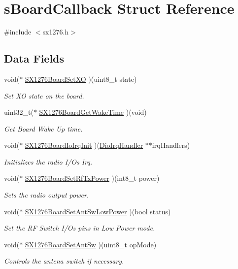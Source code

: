 \hypertarget{structsBoardCallback}{}\section{s\+Board\+Callback Struct Reference}
\label{structsBoardCallback}


{\ttfamily \#include $<$sx1276.\+h$>$}

\subsection*{Data Fields}
\begin{DoxyCompactItemize}
\item 
void($\ast$ \hyperlink{structsBoardCallback_ae6be070dbcbbcdb0f30d087e6152dd55}{S\+X1276\+Board\+Set\+XO} )(uint8\+\_\+t state)
\begin{DoxyCompactList}\small\item\em Set XO state on the board. \end{DoxyCompactList}\item 
uint32\+\_\+t($\ast$ \hyperlink{structsBoardCallback_a91e24be9e9f398614e25b89d05ee0aa3}{S\+X1276\+Board\+Get\+Wake\+Time} )(void)
\begin{DoxyCompactList}\small\item\em Get Board Wake Up time. \end{DoxyCompactList}\item 
void($\ast$ \hyperlink{structsBoardCallback_ac8a78c18252b452f5f4305be2abd1f2c}{S\+X1276\+Board\+Io\+Irq\+Init} )(\hyperlink{sx1276_8h_af462584f307238535daaea42f6ce791c}{Dio\+Irq\+Handler} $\ast$$\ast$irq\+Handlers)
\begin{DoxyCompactList}\small\item\em Initializes the radio I/\+Os Irq. \end{DoxyCompactList}\item 
void($\ast$ \hyperlink{structsBoardCallback_aec7b6d1c4de061f3d2f1bebe75c64c13}{S\+X1276\+Board\+Set\+Rf\+Tx\+Power} )(int8\+\_\+t power)
\begin{DoxyCompactList}\small\item\em Sets the radio output power. \end{DoxyCompactList}\item 
void($\ast$ \hyperlink{structsBoardCallback_a91d44db14871cfcf950cce928922ba17}{S\+X1276\+Board\+Set\+Ant\+Sw\+Low\+Power} )(bool status)
\begin{DoxyCompactList}\small\item\em Set the RF Switch I/\+Os pins in Low Power mode. \end{DoxyCompactList}\item 
void($\ast$ \hyperlink{structsBoardCallback_a9c50d59b5bffe4261b6e141d503ea74a}{S\+X1276\+Board\+Set\+Ant\+Sw} )(uint8\+\_\+t op\+Mode)
\begin{DoxyCompactList}\small\item\em Controls the antena switch if necessary. \end{DoxyCompactList}\end{DoxyCompactItemize}


